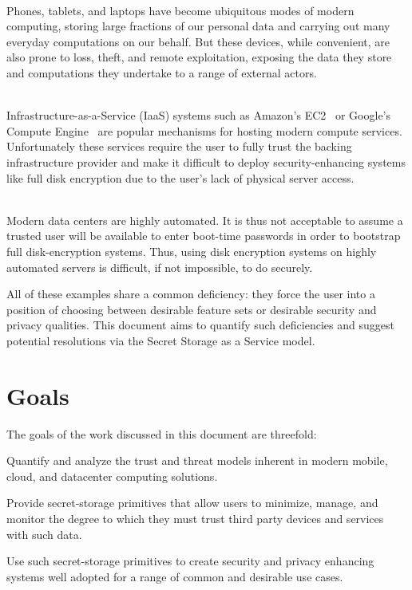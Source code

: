 \begin{packed_desc}
\item[Mobile Computing Devices] \hfill \\ Phones, tablets, and laptops
  have become ubiquitous modes of modern computing, storing large
  fractions of our personal data and carrying out many everyday
  computations on our behalf. But these devices, while convenient, are
  also prone to loss, theft, and remote exploitation, exposing the
  data they store and computations they undertake to a range of
  external actors.
\item[Cloud Computing Infrastructure] \hfill \\
  Infrastructure-as-a-Service (IaaS) systems such as Amazon's
  EC2~\cite{amazon-ec2} or Google's Compute
  Engine~\cite{google-compute} are popular mechanisms for hosting
  modern compute services. Unfortunately these services require the
  user to fully trust the backing infrastructure provider and make it
  difficult to deploy security-enhancing systems like full disk
  encryption due to the user's lack of physical server access.
\item[Datacenter Infrastructure] \hfill \\ Modern data centers are
  highly automated. It is thus not acceptable to assume a trusted user
  will be available to enter boot-time passwords in order to bootstrap
  full disk-encryption systems. Thus, using disk encryption systems on
  highly automated servers is difficult, if not impossible, to do
  securely.
\end{packed_desc}

All of these examples share a common deficiency: they force the user
into a position of choosing between desirable feature sets or
desirable security and privacy qualities. This document aims to
quantify such deficiencies and suggest potential resolutions via the
Secret Storage as a Service model.

\section{Goals}
\label{chap:intro:goals}

The goals of the work discussed in this document are threefold:

\begin{packed_item}
\item Quantify and analyze the trust and threat models inherent in
  modern mobile, cloud, and datacenter computing solutions.
\item Provide secret-storage primitives that allow users to minimize,
  manage, and monitor the degree to which they must trust third party
  devices and services with such data.
\item Use such secret-storage primitives to create security and
  privacy enhancing systems well adopted for a range of common and
  desirable use cases.
\end{packed_item}

